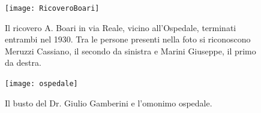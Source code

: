  \begin{figure}[htb]
    \centering
    \texttt{[image: RicoveroBoari]}
    \caption*{Il ricovero A. Boari in via Reale, vicino all'Ospedale, terminati entrambi nel 1930. Tra le persone presenti nella foto si riconoscono  Meruzzi Cassiano, il secondo da sinistra e Marini Giuseppe, il primo da destra.\label{fig:RicoveroBoari}}
\end{figure}

\newpage

 \begin{figure}[htb]
    \centering
    \texttt{[image: ospedale]}
    \caption*{\label{fig:gamberini}Il busto del Dr. Giulio Gamberini e l'omonimo ospedale.}
\end{figure}

